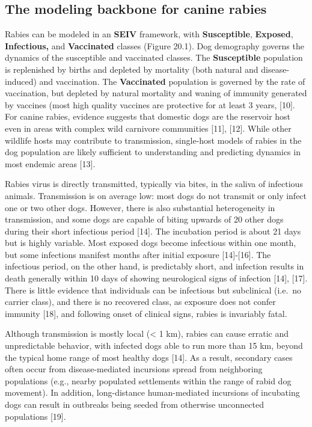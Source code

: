 \documentclass[
]{book}
\begin{document}
\hypertarget{the-modeling-backbone-for-canine-rabies}{%
\subsection{The modeling backbone for canine rabies}\label{the-modeling-backbone-for-canine-rabies}}

Rabies can be modeled in an \textbf{SEIV} framework, with \textbf{Susceptible},
\textbf{Exposed}, \textbf{Infectious,} and \textbf{Vaccinated} classes (Figure 20.1).
Dog demography governs the dynamics of the susceptible and vaccinated
classes. The \textbf{Susceptible} population is replenished by births and
depleted by mortality (both natural and disease-induced) and
vaccination. The \textbf{Vaccinated} population is governed by the rate of
vaccination, but depleted by natural mortality and waning of immunity
generated by vaccines (most high quality vaccines are protective for at
least 3 years, {[}10{]}. For canine rabies, evidence suggests that
domestic dogs are the reservoir host even in areas with complex wild
carnivore communities {[}11{]}, {[}12{]}. While other wildlife hosts may
contribute to transmission, single-host models of rabies in the dog
population are likely sufficient to understanding and predicting
dynamics in most endemic areas {[}13{]}.

Rabies virus is directly transmitted, typically via bites, in the saliva
of infectious animals. Transmission is on average low: most dogs do not
transmit or only infect one or two other dogs. However, there is also
substantial heterogeneity in transmission, and some dogs are capable of
biting upwards of 20 other dogs during their short infectious period
{[}14{]}. The incubation period is about 21 days but is highly variable.
Most exposed dogs become infectious within one month, but some
infections manifest months after initial exposure {[}14{]}-{[}16{]}. The
infectious period, on the other hand, is predictably short, and
infection results in death generally within 10 days of showing
neurological signs of infection {[}14{]}, {[}17{]}. There is little evidence
that individuals can be infectious but subclinical (i.e.~no carrier
class), and there is no recovered class, as exposure does not confer
immunity {[}18{]}, and following onset of clinical signs, rabies is
invariably fatal.

Although transmission is mostly local (\textless{} 1 km), rabies can cause
erratic and unpredictable behavior, with infected dogs able to run more
than 15 km, beyond the typical home range of most healthy dogs {[}14{]}.
As a result, secondary cases often occur from disease-mediated
incursions spread from neighboring populations (e.g., nearby populated
settlements within the range of rabid dog movement). In addition,
long-distance human-mediated incursions of incubating dogs can result in
outbreaks being seeded from otherwise unconnected populations {[}19{]}.
\end{document}

